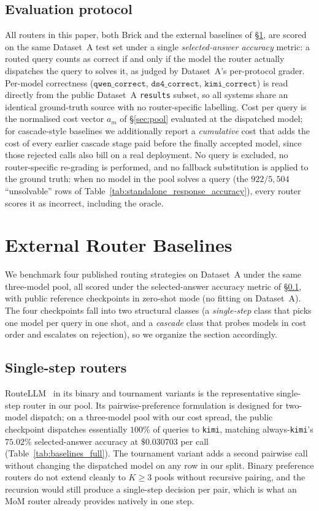 \documentclass[twocolumn,10pt,a4paper]{article}
\begin{document}
\subsection{Evaluation protocol}\label{sec:eval-protocol}
All routers in this paper, both Brick and the external baselines of §\ref{sec:baselines}, are scored on the same Dataset~A test set under a single \emph{selected-answer accuracy} metric: a routed query counts as correct if and only if the model the router actually dispatches the query to solves it, as judged by Dataset~A's per-protocol grader. Per-model correctness ($\texttt{qwen\_correct}$, $\texttt{ds4\_correct}$, $\texttt{kimi\_correct}$) is read directly from the public Dataset~A \texttt{results} subset, so all systems share an identical ground-truth source with no router-specific labelling. Cost per query is the normalised cost vector $a_m$ of §\ref{sec:pool} evaluated at the dispatched model; for cascade-style baselines we additionally report a \emph{cumulative} cost that adds the cost of every earlier cascade stage paid before the finally accepted model, since those rejected calls also bill on a real deployment. No query is excluded, no router-specific re-grading is performed, and no fallback substitution is applied to the ground truth: when no model in the pool solves a query (the $922 / 5{,}504$ ``unsolvable'' rows of Table~\ref{tab:standalone_response_accuracy}), every router scores it as incorrect, including the oracle.

\section{External Router Baselines}\label{sec:baselines}
We benchmark four published routing strategies on Dataset~A under the same three-model pool, all scored under the selected-answer accuracy metric of §\ref{sec:eval-protocol}, with public reference checkpoints in zero-shot mode (no fitting on Dataset~A). The four checkpoints fall into two structural classes (a \emph{single-step} class that picks one model per query in one shot, and a \emph{cascade} class that probes models in cost order and escalates on rejection), so we organize the section accordingly.

\subsection{Single-step routers}\label{sec:baselines-singlestep}
RouteLLM~\cite{ong2024routellm} in its binary and tournament variants is the representative single-step router in our pool. Its pairwise-preference formulation is designed for two-model dispatch; on a three-model pool with our cost spread, the public checkpoint dispatches essentially $100\%$ of queries to \texttt{kimi}, matching always-\texttt{kimi}'s $75.02\%$ selected-answer accuracy at $\$0.030703$ per call (Table~\ref{tab:baselines_full}). The tournament variant adds a second pairwise call without changing the dispatched model on any row in our split. Binary preference routers do not extend cleanly to $K{\ge}3$ pools without recursive pairing, and the recursion would still produce a single-step decision per pair, which is what an MoM router already provides natively in one step.
\end{document}
